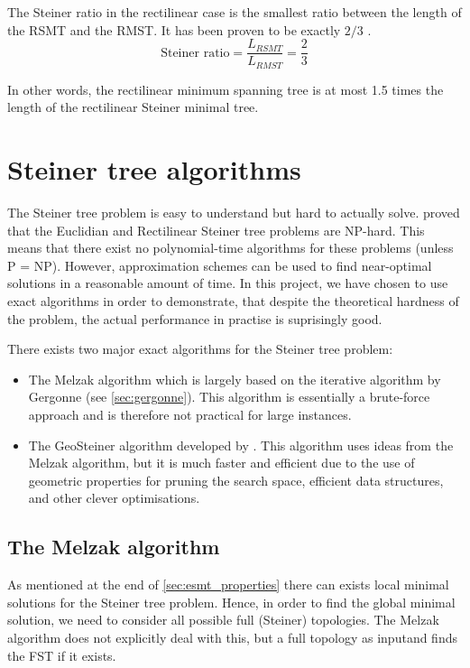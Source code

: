 \documentclass{l4proj}
\begin{document}
The Steiner ratio in the rectilinear case is the smallest ratio between the length of the RSMT and the RMST. It has been proven to be exactly $2/3$ \cite{Brazil2015}.
$$
    \text{Steiner ratio} = \frac{L_{RSMT}}{L_{RMST}} = \frac{2}{3}
$$

In other words, the rectilinear minimum spanning tree is at most 1.5 times the length of the rectilinear Steiner minimal tree.

\section{Steiner tree algorithms}
\label{sec:algorithms}
The Steiner tree problem is easy to understand but hard to actually solve. \cite{Garey1977} proved that the Euclidian and Rectilinear Steiner tree problems are NP-hard. This means that there exist no polynomial-time algorithms for these problems (unless P = NP).
However, approximation schemes can be used to find near-optimal solutions in a reasonable amount of time. In this project, we have chosen to use exact algorithms in order to demonstrate, that despite the theoretical hardness of the problem, the actual performance in practise is suprisingly good.

There exists two major exact algorithms for the Steiner tree problem:
\begin{itemize}
    \item The Melzak algorithm \cite{MelzakAlgo} which is largely based on the iterative algorithm by Gergonne \citep{Brazil2014} (see \ref{sec:gergonne}). This algorithm is essentially a brute-force approach and is therefore not practical for large instances.
    \item The GeoSteiner algorithm developed by \cite{geosteiner96}. This algorithm uses ideas from the Melzak algorithm, but it is much faster and efficient due to the use of geometric properties for pruning the search space, efficient data structures, and other clever optimisations.
\end{itemize}
\subsection{The Melzak algorithm}
\label{sec:melzak_algo}
As mentioned at the end of \ref{sec:esmt_properties} there can exists local minimal solutions for the Steiner tree problem. Hence, in order to find the global minimal solution, we need to consider all possible full (Steiner) topologies. The Melzak algorithm does not explicitly deal with this, but a full topology as inputand finds the FST if it exists.
\end{document}
